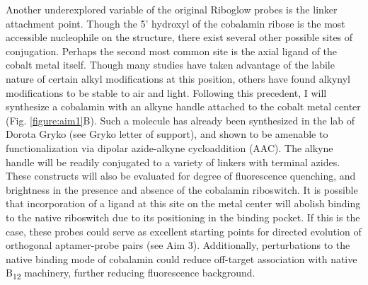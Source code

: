 Another underexplored variable of the original Riboglow probes is the linker attachment point.
Though the 5' hydroxyl of the cobalamin ribose is the most accessible nucleophile on the structure, there exist several other possible sites of conjugation.
Perhaps the second most common site is the axial ligand of the cobalt metal itself.
Though many studies have taken advantage of the labile nature of certain alkyl modifications at this position,\cite{ShellVitaminB12Tunable2015} others have found alkynyl modifications to be stable to air and light.\cite{ChrominskiReductionfreesynthesisstable2013,RuetzMarkusPhenylethynylcobalaminLightStable2013}
Following this precedent, I will synthesize a cobalamin with an alkyne handle attached to the cobalt metal center (Fig. \ref{figure:aim1}B).
Such a molecule has already been synthesized in the lab of Dorota Gryko (see Gryko letter of support), and shown to be amenable to functionalization via dipolar azide-alkyne cycloaddition (AAC).\cite{ChrominskiVitaminB12Derivatives2014}
The alkyne handle will be readily conjugated to a variety of linkers with terminal azides.\cite{KolbHartmuthC.ClickChemistryDiverse2001,PattersonFindingRightBioorthogonal2014}
These constructs will also be evaluated for degree of fluorescence quenching, and brightness in the presence and absence of the cobalamin riboswitch.
It is possible that incorporation of a ligand at this site on the metal center will abolish binding to the native riboswitch due to its positioning in the binding pocket.\cite{JohnsonJrB12cofactorsdirectly2012}
If this is the case, these probes could serve as excellent starting points for directed evolution of orthogonal aptamer-probe pairs (see Aim 3). %
Additionally, perturbations to the native binding mode of cobalamin could reduce off-target association with native B\textsubscript{12} machinery,\cite{PathareSynthesisCobalaminBiotin1996} further reducing fluorescence background.

